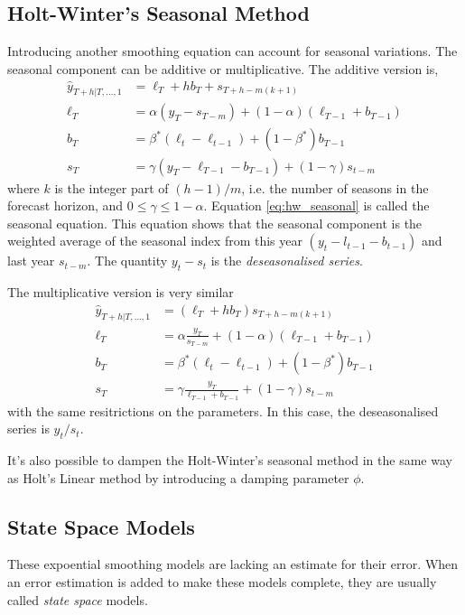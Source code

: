 \documentclass[a4paper,12pt]{article}
\theoremstyle{definition}
\begin{document}
\subsection{Holt-Winter's Seasonal Method}\label{sec:hw_seasonal}
Introducing another smoothing equation can account for seasonal variations. The seasonal component can be additive or multiplicative. The additive version is,
\begin{align}
	\hat{y}_{T+h|T,\dots,1} &= \ell_T + hb_T + s_{T+h-m(k+1)} \label{eq:hw_forecast}\\
	\ell_T &= \alpha (y_T - s_{T-m}) + (1 - \alpha)\left(\ell_{T-1} + b_{T-1}\right) \label{eq:hw_level} \\
	b_T &= \beta^*\left( \ell_t - \ell_{t-1} \right) + (1 - \beta^*)b_{T-1} \label{eq:hw_trend} \\
	s_T &= \gamma \left( y_T - \ell_{T-1} - b_{T-1} \right) + \left( 1 - \gamma \right)s_{t-m} \label{eq:hw_seasonal}
\end{align}
where $k$ is the integer part of $(h-1)/m$, i.e. the number of seasons in the forecast horizon, and $0 \leq \gamma \leq 1 - \alpha$. Equation \ref{eq:hw_seasonal} is called the seasonal equation. This equation shows that the seasonal component is the weighted average of the seasonal index from this year $(y_t - l_{t-1} - b_{t-1})$ and last year $s_{t-m}$. The quantity $y_t - s_t$ is the \textit{deseasonalised series}.

The multiplicative version is very similar
\begin{align}
	\hat{y}_{T+h|T,\dots,1} &= (\ell_T + hb_T)s_{T+h-m(k+1)} \label{eq:hw_forecast}\\
	\ell_T &= \alpha \frac{y_T}{ s_{T-m}} + (1 - \alpha)\left(\ell_{T-1} + b_{T-1}\right) \label{eq:hw_level} \\
	b_T &= \beta^*\left( \ell_t - \ell_{t-1} \right) + (1 - \beta^*)b_{T-1} \label{eq:hw_trend} \\
	s_T &= \gamma \frac{y_T}{\ell_{T-1} + b_{T-1}} + \left( 1 - \gamma \right)s_{t-m} \label{eq:hw_seasonal}
\end{align}
with the same resitrictions on the parameters. In this case, the deseasonalised series is $y_t/s_t$.

It's also possible to dampen the Holt-Winter's seasonal method in the same way as Holt's Linear method by introducing a damping parameter $\phi$.

\subsection{State Space Models}
These expoential smoothing models are lacking an estimate for their error. When an error estimation is added to make these models complete, they are usually called \textit{state space} models.
\end{document}
